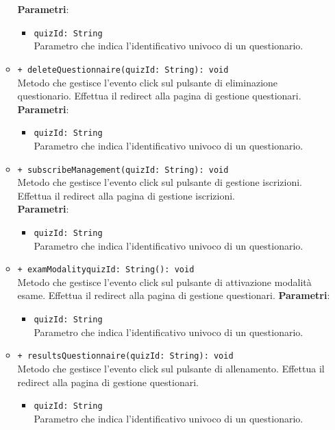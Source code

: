 \begin{itemize}
\begin{itemize}
		\textbf{Parametri}:
		\begin{itemize}
			\item \texttt{quizId: String}\\ 
			Parametro che indica l'identificativo univoco di un questionario.
		\end{itemize}
		\item \texttt{+ deleteQuestionnaire(quizId: String): void} \\
		Metodo che gestisce l'evento click sul pulsante di eliminazione questionario. Effettua il redirect alla pagina di gestione questionari.\\
		\textbf{Parametri}:  
		\begin{itemize}
			\item \texttt{quizId: String}\\
			Parametro che indica l'identificativo univoco di un questionario.
		\end{itemize}
		
		\item \texttt{+ subscribeManagement(quizId: String): void} \\
		Metodo che gestisce l'evento click sul pulsante di gestione iscrizioni. Effettua il redirect alla pagina di gestione iscrizioni.\\
		\textbf{Parametri}:
		\begin{itemize}
			\item \texttt{quizId: String}\\
			Parametro che indica l'identificativo univoco di un questionario.
		\end{itemize}
		
		\item \texttt{+ examModalityquizId: String(): void} \\
		Metodo che gestisce l'evento click sul pulsante di attivazione modalità esame. Effettua il redirect alla pagina di gestione questionari.
		\textbf{Parametri}:
		\begin{itemize}
			\item \texttt{quizId: String}\\ 
			Parametro che indica l'identificativo univoco di un questionario.
		\end{itemize}
		\item \texttt{+ resultsQuestionnaire(quizId: String): void} \\
		Metodo che gestisce l'evento click sul pulsante di allenamento. Effettua il redirect alla pagina di gestione questionari.
		\begin{itemize}
			\item \texttt{quizId: String}\\
			Parametro che indica l'identificativo univoco di un questionario.
		\end{itemize}   
	\end{itemize}
\end{itemize}